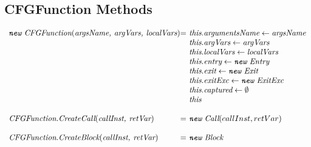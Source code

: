 \subsection{CFGFunction Methods}
\[
\begin{array}{l@{}l@{~}l}
\emph{\TT{new}\ CFGFunction}(\emph{argsName, argVars, localVars})
& = & \emph{this}.\emph{argumentsName} \leftarrow \emph{argsName} \\
& & \emph{this}.\emph{argVars} \leftarrow \emph{argVars}\\
& & \emph{this}.\emph{localVars} \leftarrow \emph{localVars}\\
& & \emph{this}.\emph{entry} \leftarrow \emph{\TT{new}\ Entry}\\
& & \emph{this}.\emph{exit} \leftarrow \emph{\TT{new}\ Exit}\\
& & \emph{this}.\emph{exitExc} \leftarrow \emph{\TT{new}\ ExitExc}\\
& & \emph{this}.\emph{captured} \leftarrow \emptyset\\
& & \emph{this}\\
& & \\

\emph{CFGFunction}.\emph{CreateCall}(\emph{callInst, retVar})
& = & \emph{\TT{new}\ Call}(callInst, retVar)\\
& & \\

\emph{CFGFunction}.\emph{CreateBlock}(\emph{callInst, retVar})
& = & \emph{\TT{new}\ Block}\\
\end{array}
\]

